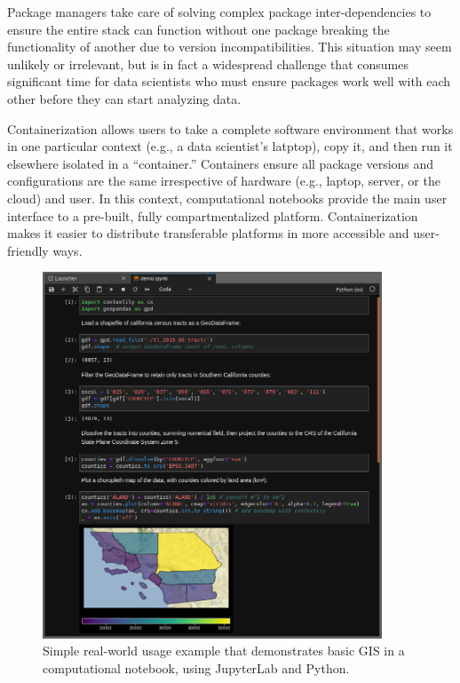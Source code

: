 \documentclass[11pt,letterpaper]{article}
\begin{document}
Package managers take care of solving complex package inter-dependencies to ensure the entire stack can function without one package breaking the functionality of another due to version incompatibilities. This situation may seem unlikely or irrelevant, but is in fact a widespread challenge that consumes significant time for data scientists who must ensure packages work well with each other before they can start analyzing data.

Containerization allows users to take a complete software environment that works in one particular context (e.g., a data scientist's latptop), copy it, and then run it elsewhere isolated in a \enquote{container.} Containers ensure all package versions and configurations are the same irrespective of hardware (e.g., laptop, server, or the cloud) and user. In this context, computational notebooks provide the main user interface to a pre-built, fully compartmentalized platform. Containerization makes it easier to distribute transferable platforms in more accessible and user-friendly ways.

\begin{figure}[!bt]
	\centering
	\includegraphics[width=0.9\textwidth]{code-demo.png}
	\caption{Simple real-world usage example that demonstrates basic GIS in a computational notebook, using JupyterLab and Python.}
	\label{fig:code_demo}
\end{figure}
\end{document}
